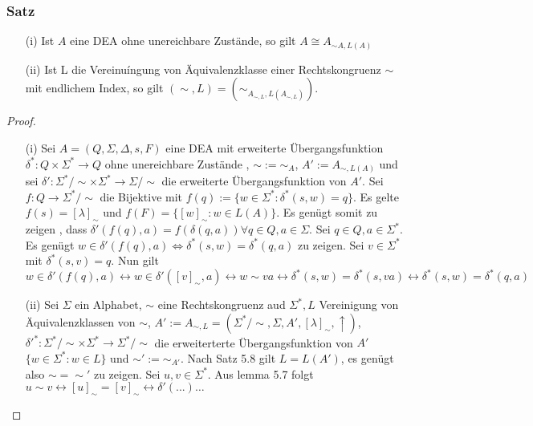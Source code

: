     \subsubsection*{Satz}
    \begin{itemize}
        \item [(i)] Ist $A$ eine DEA ohne unereichbare Zustände, so gilt $A \cong A_{\sim A, L(A)}$
        \item [(ii)] Ist L die Vereinuíngung von Äquivalenzklasse einer Rechtskongruenz $\sim$ mit endlichem Index, so gilt $(\sim, L) = (\sim_{A_{\sim, L}, L(A_{\sim, L})})$.
      \end{itemize}
    
      \begin{proof}
        \begin{itemize}
          \item [(i)] Sei $A = (Q, \Sigma, \Delta, s, F)$ eine DEA mit erweiterte Übergangsfunktion $\delta^* : Q \times \Sigma^* \to Q$ ohne unereichbare Zustände , $\sim := \sim_A$, $A' := A_{\sim, L(A)}$ und sei $\delta' : \Sigma^* / \sim \times \Sigma^* \to \Sigma/\sim$ die erweiterte Übergangsfunktion von $A'$. Sei $f : Q \to \Sigma^* / \sim$ die Bijektive mit $f(q) := \{ w \in \Sigma^* : \delta^*(s,w) = q\}$. Es gelte $f(s) = [\lambda]_{\sim}$ und $f(F) = \{[w]_{\sim} : w \in L(A)\}$. Es genügt somit zu zeigen , dass $\delta'(f(q), a) = f(\delta(q,a)) \forall q \in Q, a \in \Sigma$. Sei $q \in Q, a \in \Sigma^*$. Es genügt $w \in \delta' (f(q), a) \Leftrightarrow \delta^*(s,w) = \delta^*(q, a)$ zu zeigen. Sei $v \in \Sigma^*$ mit $\delta^*(s,v) = q$. Nun gilt $w \in \delta'(f(q), a) \leftrightarrow w \in \delta'([v]_{\sim}, a) \leftrightarrow w \sim va \leftrightarrow \delta^*(s,w) = \delta^*(s, va) \leftrightarrow \delta^*(s,w) = \delta^*(q,a)$  %
          \item [(ii)] Sei $\Sigma$ ein Alphabet, $\sim$ eine Rechtskongruenz aud $\Sigma^*, L$ Vereinigung von Äquivalenzklassen von $\sim$, $A' := A_{\sim, L} = (\Sigma^*/\sim, \Sigma, A', [\lambda]_{\sim}, \uparrow)$, $\delta'^* : \Sigma^*/\sim \times \Sigma^* \to \Sigma^*/\sim$ die erweiterterte Übergangsfunktion von $A'$ $\{w \in \Sigma^* : w \in L \}$ und $\sim' := \sim_{A'}$. Nach Satz 5.8 gilt $L = L(A')$, es genügt also $\sim = \sim'$ zu zeigen. Sei $u, v \in \Sigma^*$. Aus lemma 5.7 folgt $u \sim v \leftrightarrow 
          [u]_{\sim} = [v]_{\sim} \leftrightarrow \delta'(...)$$\dots$
        \end{itemize}
      \end{proof}
